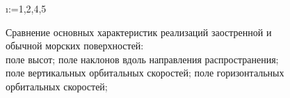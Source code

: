\begin{figure}[h]
\centering
\makeatletter
    \@for\i:={1,2,4,5}

\label{fig:cwm_modeling}
\caption{
    Сравнение основных характеристик реализаций заостренной и обычной
    морских поверхностей: \\
     поле высот;
     поле наклонов вдоль направления
    распространения;
     поле вертикальных орбитальных скоростей;
     поле горизонтальных орбитальных скоростей;
}
\makeatother
\end{figure}


